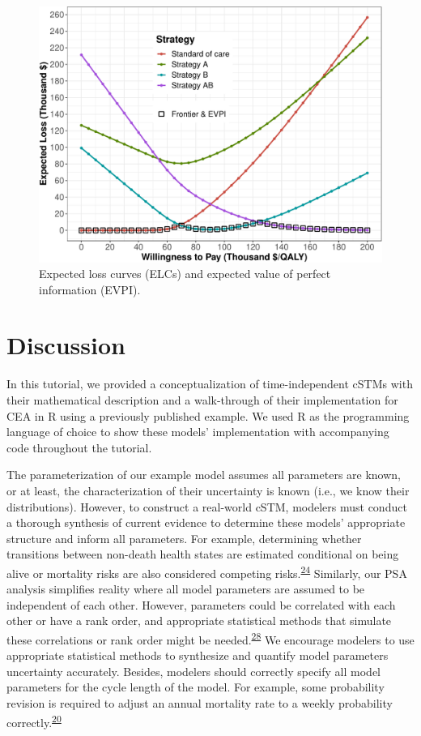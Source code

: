 \documentclass[
]{article}
\begin{document}
\begin{figure}[H]

{\centering \includegraphics{figs/ELC-1} 

}

\caption{Expected loss curves (ELCs) and expected value of perfect information (EVPI).}\label{fig:ELC}
\end{figure}

\hypertarget{discussion}{%
\section{Discussion}\label{discussion}}

In this tutorial, we provided a conceptualization of time-independent cSTMs with their mathematical description and a walk-through of their implementation for CEA in R using a previously published example. We used R as the programming language of choice to show these models' implementation with accompanying code throughout the tutorial.

The parameterization of our example model assumes all parameters are known, or at least, the characterization of their uncertainty is known (i.e., we know their distributions). However, to construct a real-world cSTM, modelers must conduct a thorough synthesis of current evidence to determine these models' appropriate structure and inform all parameters. For example, determining whether transitions between non-death health states are estimated conditional on being alive or mortality risks are also considered competing risks.\textsuperscript{\protect\hyperlink{ref-Briggs2012}{24}} Similarly, our PSA analysis simplifies reality where all model parameters are assumed to be independent of each other. However, parameters could be correlated with each other or have a rank order, and appropriate statistical methods that simulate these correlations or rank order might be needed.\textsuperscript{\protect\hyperlink{ref-Goldhaber-Fiebert2015}{28}} We encourage modelers to use appropriate statistical methods to synthesize and quantify model parameters uncertainty accurately. Besides, modelers should correctly specify all model parameters for the cycle length of the model. For example, some probability revision is required to adjust an annual mortality rate to a weekly probability correctly.\textsuperscript{\protect\hyperlink{ref-Hunink2014}{20}}
\end{document}
